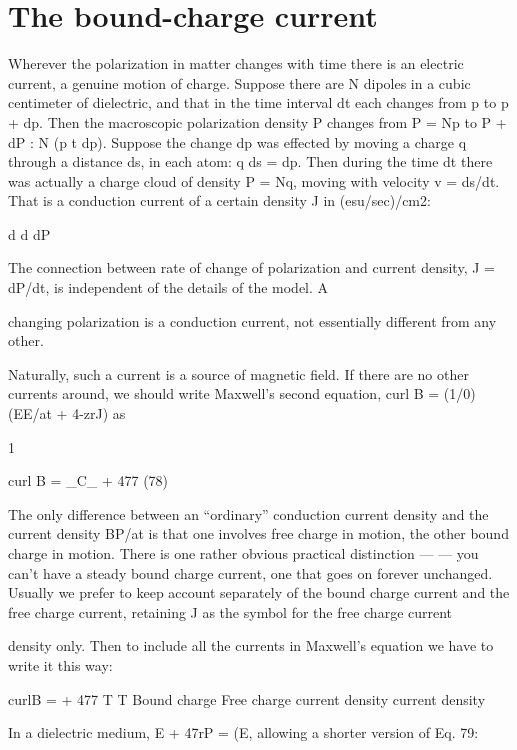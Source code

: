 \section{The bound-charge current}

Wherever the polarization in matter changes with time there is
an electric current, a genuine motion of charge. Suppose there are
N dipoles in a cubic centimeter of dielectric, and that in the time
interval dt each changes from p to p + dp. Then the macroscopic
polarization density P changes from P = Np to P + dP : N (p t dp).
Suppose the change dp was effected by moving a charge q through a
distance ds, in each atom: q ds = dp. Then during the time dt there
was actually a charge cloud of density P = Nq, moving with velocity
v = ds/dt. That is a conduction current of a certain density J in
(esu/sec)/cm2:

d d dP

The connection between rate of change of polarization and current
density, J = dP/dt, is independent of the details of the model. A

changing polarization is a conduction current, not essentially different
from any other.

Naturally, such a current is a source of magnetic field. If there
are no other currents around, we should write Maxwell's second
equation, curl B = (1/0) (EE/at + 4-zrJ) as

\begin{equation}
\end{equation}
1

curl B = _C_  + 477  (78)

The only difference between an ``ordinary'' conduction current
density and the current density BP/at is that one involves free charge
in motion, the other bound charge in motion. There is one rather
obvious practical distinction ---  --- you can't have a steady bound charge
current, one that goes on forever unchanged. Usually we prefer to
keep account separately of the bound charge current and the free
charge current, retaining J as the symbol for the free charge current

density only. Then to include all the currents in Maxwell's equation
we have to write it this way:

\begin{equation}
\end{equation}
curlB =  + 477%
T T
Bound charge Free charge
current density current density

In a dielectric medium, E + 47rP = (E, allowing a shorter version
of Eq. 79:

